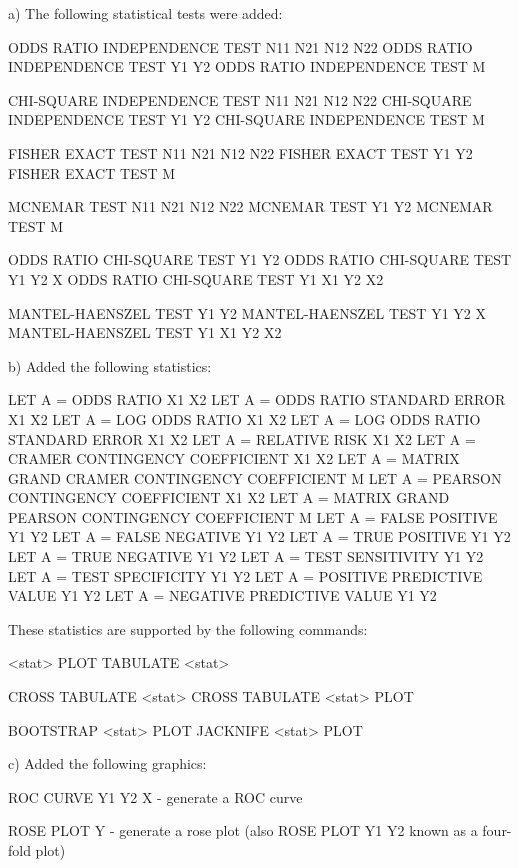 {    a) The following statistical tests were added:

          ODDS RATIO INDEPENDENCE TEST N11 N21 N12 N22
          ODDS RATIO INDEPENDENCE TEST Y1 Y2
          ODDS RATIO INDEPENDENCE TEST M

          CHI-SQUARE INDEPENDENCE TEST N11 N21 N12 N22
          CHI-SQUARE INDEPENDENCE TEST Y1 Y2
          CHI-SQUARE INDEPENDENCE TEST M

          FISHER EXACT TEST N11 N21 N12 N22
          FISHER EXACT TEST Y1 Y2
          FISHER EXACT TEST M

          MCNEMAR TEST N11 N21 N12 N22
          MCNEMAR TEST Y1 Y2
          MCNEMAR TEST M

          ODDS RATIO CHI-SQUARE TEST Y1 Y2
          ODDS RATIO CHI-SQUARE TEST Y1 Y2 X
          ODDS RATIO CHI-SQUARE TEST Y1 X1 Y2 X2

          MANTEL-HAENSZEL TEST Y1 Y2
          MANTEL-HAENSZEL TEST Y1 Y2 X
          MANTEL-HAENSZEL TEST Y1 X1 Y2 X2

    b) Added the following statistics:

          LET A = ODDS RATIO X1 X2
          LET A = ODDS RATIO STANDARD ERROR X1 X2
          LET A = LOG ODDS RATIO X1 X2
          LET A = LOG ODDS RATIO STANDARD ERROR X1 X2
          LET A = RELATIVE RISK X1 X2
          LET A = CRAMER CONTINGENCY COEFFICIENT X1 X2
          LET A = MATRIX GRAND CRAMER CONTINGENCY COEFFICIENT M
          LET A = PEARSON CONTINGENCY COEFFICIENT X1 X2
          LET A = MATRIX GRAND PEARSON CONTINGENCY COEFFICIENT M
          LET A = FALSE POSITIVE Y1 Y2
          LET A = FALSE NEGATIVE Y1 Y2
          LET A = TRUE POSITIVE Y1 Y2
          LET A = TRUE NEGATIVE Y1 Y2
          LET A = TEST SENSITIVITY Y1 Y2
          LET A = TEST SPECIFICITY Y1 Y2
          LET A = POSITIVE PREDICTIVE VALUE Y1 Y2
          LET A = NEGATIVE PREDICTIVE VALUE Y1 Y2

       These statistics are supported by the following commands:

          <stat> PLOT
          TABULATE <stat> 

          CROSS TABULATE <stat> 
          CROSS TABULATE <stat> PLOT

          BOOTSTRAP <stat> PLOT
          JACKNIFE <stat> PLOT

    c) Added the following graphics:

          ROC CURVE Y1 Y2 X   - generate a ROC curve

          ROSE PLOT Y         - generate a rose plot (also
          ROSE PLOT Y1 Y2       known as a four-fold plot)

}
